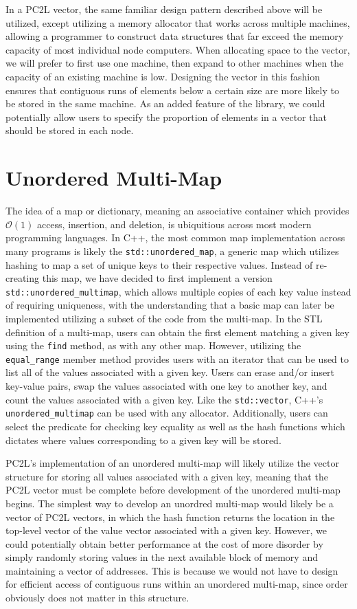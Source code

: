 In a PC2L vector, the same familiar design pattern described above will be utilized, except utilizing a memory allocator that works across multiple machines, allowing a programmer to construct data structures that far exceed the memory capacity of most individual node computers. When allocating space to the vector, we will prefer to first use one machine, then expand to other machines when the capacity of an existing machine is low. Designing the vector in this fashion ensures that contiguous runs of elements below a certain size are more likely to be stored in the same machine. As an added feature of the library, we could potentially allow users to specify the proportion of elements in a vector that should be stored in each node.   
\section{Unordered Multi-Map}
The idea of a map or dictionary, meaning an associative container which provides $\mathcal{O}(1)$ access, insertion, and deletion, is ubiquitious across most modern programming languages. In C++, the most common map implementation across many programs is likely the \texttt{std::unordered\_map}, a generic map which utilizes hashing to map a set of unique keys to their respective values. Instead of re-creating this map, we have decided to first implement a version \texttt{std::unordered\_multimap}, which allows multiple copies of each key value instead of requiring uniqueness, with the understanding that a basic map can later be implemented utilizing a subset of the code from the multi-map. In the STL definition of a multi-map, users can obtain the first element matching a given key using the \texttt{find} method, as with any other map. However, utilizing the \texttt{equal\_range} member method provides users with an iterator that can be used to list all of the values associated with a given key. Users can erase and/or insert key-value pairs, swap the values associated with one key to another key, and count the values associated with a given key. Like the \texttt{std::vector}, C++'s \texttt{unordered\_multimap} can be used with any allocator. Additionally, users can select the predicate for checking key equality as well as the hash functions which dictates where values corresponding to a given key will be stored.

PC2L's implementation of an unordered multi-map will likely utilize the vector structure for storing all values associated with a given key, meaning that the PC2L vector must be complete before development of the unordered multi-map begins. The simplest way to develop an unordred multi-map would likely be a vector of PC2L vectors, in which the hash function returns the location in the top-level vector of the value vector associated with a given key. However, we could potentially obtain better performance at the cost of more disorder by simply randomly storing values in the next available block of memory and maintaining a vector of addresses. This is because we would not have to design for efficient access of contiguous runs within an unordered multi-map, since order obviously does not matter in this structure. 

